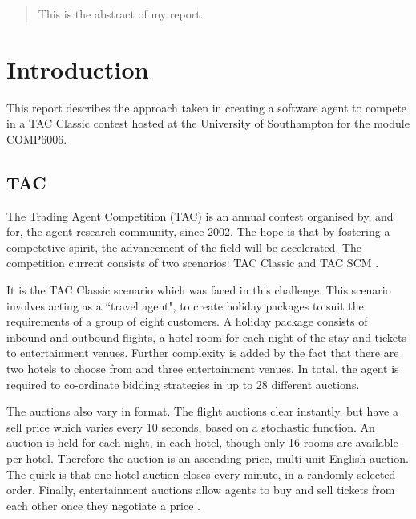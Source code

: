 \documentclass{acm_proc_article-sp}
\begin{document}
\maketitle


\begin{abstract}
 This is the abstract of my report.
\end{abstract}




\section{Introduction}

 This report describes the approach taken in creating a software agent to compete in a TAC Classic contest hosted at the University of Southampton for the module COMP6006.
 
 \subsection{TAC}
 The Trading Agent Competition (TAC) is an annual contest organised by, and for, the agent research community, since 2002.  The hope is that by fostering a competetive spirit, the advancement of the field will be accelerated.  The competition current consists of two scenarios: TAC Classic and TAC SCM \cite{SICS2007a}.
 
 It is the TAC Classic scenario which was faced in this challenge.  This scenario involves acting as a ``travel agent", to create holiday packages to suit the requirements of a group of eight customers.  A holiday package consists of inbound and outbound flights, a hotel room for each night of the stay and tickets to entertainment venues.  Further complexity is added by the fact that there are two hotels to choose from and three entertainment venues.  In total, the agent is required to co-ordinate bidding strategies in up to 28 different auctions.
 
 The auctions also vary in format.  The flight auctions clear instantly, but have a sell price which varies every 10 seconds, based on a stochastic function.  An auction is held for each night, in each hotel, though only 16 rooms are available per hotel.  Therefore the auction is an ascending-price, multi-unit English auction.  The quirk is that one hotel auction closes every minute, in a randomly selected order.  Finally, entertainment auctions allow agents to buy and sell tickets from each other once they negotiate a price \cite{SICS2007b}.
 
\end{document}
